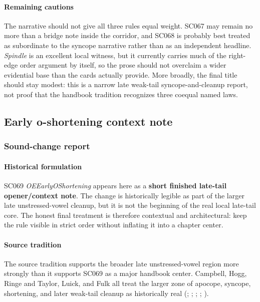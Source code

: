 \documentclass[
  british,
  a4paper,
]{article}
\begin{document}
\paragraph{Remaining cautions}\label{remaining-cautions-42}

The narrative should not give all three rules equal weight. SC067 may
remain no more than a bridge note inside the corridor, and SC068 is
probably best treated as subordinate to the syncope narrative rather
than as an independent headline. \emph{Spindle} is an excellent local
witness, but it currently carries much of the right-edge order argument
by itself, so the prose should not overclaim a wider evidential base
than the cards actually provide. More broadly, the final title should
stay modest: this is a narrow late weak-tail syncope-and-cleanup report,
not proof that the handbook tradition recognizes three coequal named
laws.

\subsection{Early o-shortening context
note}\label{early-o-shortening-context-note}

\subsubsection{Sound-change report}\label{sound-change-report-43}

\paragraph{Historical formulation}\label{historical-formulation-43}

SC069 \emph{OEEarlyOShortening} appears here as a \textbf{short finished
late-tail opener/context note}. The change is historically legible as
part of the larger late unstressed-vowel cleanup, but it is not the
beginning of the real local late-tail core. The honest final treatment
is therefore contextual and architectural: keep the rule visible in
strict order without inflating it into a chapter center.

\paragraph{Source tradition}\label{source-tradition-43}

The source tradition supports the broader late unstressed-vowel region
more strongly than it supports SC069 as a major handbook center.
Campbell, Hogg, Ringe and Taylor, Luick, and Fulk all treat the larger
zone of apocope, syncope, shortening, and later weak-tail cleanup as
historically real (; ;
; ; ).
\end{document}
